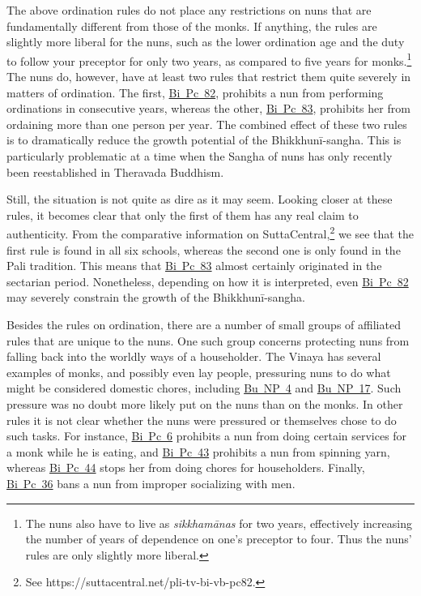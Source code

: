 \documentclass[12pt,openany]{book}%
\begin{document}
The above ordination rules do not place any restrictions on nuns that are fundamentally different from those of the monks. If anything, the rules are slightly more liberal for the nuns, such as the lower ordination age and the duty to follow your preceptor for only two years, as compared to five years for monks.\footnote{The nuns also have to live as \textit{\textsanskrit{sikkhamānas}} for two years, effectively increasing the number of years of dependence on one’s preceptor to four. Thus the nuns’ rules are only slightly more liberal. } The nuns do, however, have at least two rules that restrict them quite severely in matters of ordination. The first, \href{https://suttacentral.net/pli-tv-bi-vb-pc82/en/brahmali\#1.14.1}{Bi~Pc~82}, prohibits a nun from performing ordinations in consecutive years, whereas the other, \href{https://suttacentral.net/pli-tv-bi-vb-pc83/en/brahmali\#1.16.1}{Bi~Pc~83}, prohibits her from ordaining more than one person per year. The combined effect of these two rules is to dramatically reduce the growth potential of the \textsanskrit{Bhikkhunī}-sangha. This is particularly problematic at a time when the Sangha of nuns has only recently been reestablished in Theravada Buddhism.

Still, the situation is not quite as dire as it may seem. Looking closer at these rules, it becomes clear that only the first of them has any real claim to authenticity. From the comparative information on SuttaCentral,\footnote{See https://suttacentral.net/pli-tv-bi-vb-pc82. } we see that the first rule is found in all six schools, whereas the second one is only found in the Pali tradition. This means that \href{https://suttacentral.net/pli-tv-bi-vb-pc83/en/brahmali\#1.16.1}{Bi~Pc~83} almost certainly originated in the sectarian period. Nonetheless, depending on how it is interpreted, even \href{https://suttacentral.net/pli-tv-bi-vb-pc82/en/brahmali\#1.14.1}{Bi~Pc~82} may severely constrain the growth of the \textsanskrit{Bhikkhunī}-sangha.

Besides the rules on ordination, there are a number of small groups of affiliated rules that are unique to the nuns. One such group concerns protecting nuns from falling back into the worldly ways of a householder. The Vinaya has several examples of monks, and possibly even lay people, pressuring nuns to do what might be considered domestic chores, including \href{https://suttacentral.net/pli-tv-bu-vb-np4/en/brahmali\#1.31.1}{Bu~NP~4} and \href{https://suttacentral.net/pli-tv-bu-vb-np17/en/brahmali\#1.20.1}{Bu~NP~17}. Such pressure was no doubt more likely put on the nuns than on the monks. In other rules it is not clear whether the nuns were pressured or themselves chose to do such tasks. For instance, \href{https://suttacentral.net/pli-tv-bi-vb-pc6/en/brahmali\#1.19.1}{Bi~Pc~6} prohibits a nun from doing certain services for a monk while he is eating, and \href{https://suttacentral.net/pli-tv-bi-vb-pc43/en/brahmali\#1.14.1}{Bi~Pc~43} prohibits a nun from spinning yarn, whereas \href{https://suttacentral.net/pli-tv-bi-vb-pc44/en/brahmali\#1.11.1}{Bi~Pc~44} stops her from doing chores for householders. Finally, \href{https://suttacentral.net/pli-tv-bi-vb-pc36/en/brahmali\#1.11.1}{Bi~Pc~36} bans a nun from improper socializing with men.
\end{document}
